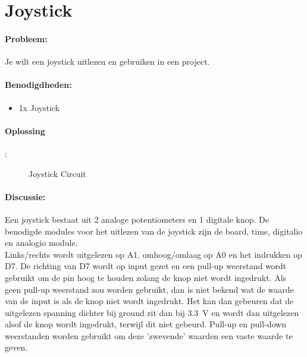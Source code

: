 \newpage
\section{Joystick}
	\paragraph{Probleem:} Je wilt een joystick uitlezen en gebruiken in een project. 
	\paragraph{Benodigdheden:}
	\begin{itemize}
		\item 1x Joystick
	\end{itemize}
	\paragraph{Oplossing}:
		\begin{figure}[H]
			\caption{Joystick Circuit}
			\label{fig:Joystick}
		\end{figure}
	\newpage
		
	\paragraph{Discussie:} Een joystick bestaat uit 2 analoge potentiometers en 1 digitale knop. De benodigde modules voor het uitlezen van de joystick zijn de board, time, digitalio en analogio module.\\
	
	Links/rechts wordt uitgelezen op A1, omhoog/omlaag op A0 en het indrukken op D7.  De richting van D7 wordt op input gezet en een pull-up weerstand wordt gebruikt om de pin hoog te houden zolang de knop niet wordt ingedrukt. Als geen pull-up weerstand zou worden gebruikt, dan is niet bekend wat de waarde van de input is als de knop niet wordt ingedrukt. Het kan dan gebeuren dat de uitgelezen spanning dichter bij ground zit dan bij \SI{3.3}{\volt} en wordt dan uitgelezen alsof de knop wordt ingedrukt, terwijl dit niet gebeurd. Pull-up en pull-down weerstanden worden gebruikt om deze 'zwevende' waarden een vaste waarde te geven. \\
	
